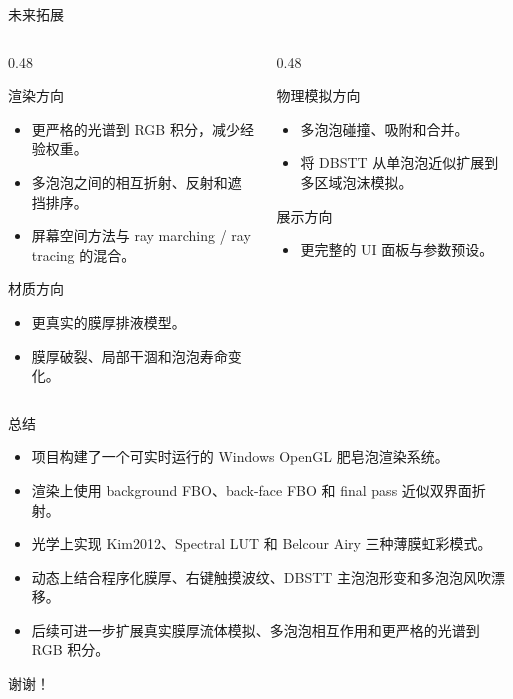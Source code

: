 \documentclass[11pt,aspectratio=169]{beamer}
\begin{document}
\begin{frame}{未来拓展}
  \begin{columns}[T]
    \begin{column}{0.48\linewidth}
      \begin{block}{渲染方向}
        \begin{itemize}
          \item 更严格的光谱到 RGB 积分，减少经验权重。
          \item 多泡泡之间的相互折射、反射和遮挡排序。
          \item 屏幕空间方法与 ray marching / ray tracing 的混合。
        \end{itemize}
      \end{block}
      \begin{block}{材质方向}
        \begin{itemize}
          \item 更真实的膜厚排液模型。
          \item 膜厚破裂、局部干涸和泡泡寿命变化。
        \end{itemize}
      \end{block}
    \end{column}
    \begin{column}{0.48\linewidth}
      \begin{block}{物理模拟方向}
        \begin{itemize}
          \item 多泡泡碰撞、吸附和合并。
          \item 将 DBSTT 从单泡泡近似扩展到多区域泡沫模拟。
        \end{itemize}
      \end{block}
      \begin{block}{展示方向}
        \begin{itemize}
          \item 更完整的 UI 面板与参数预设。
        \end{itemize}
      \end{block}
    \end{column}
  \end{columns}
\end{frame}

\begin{frame}{总结}
  \begin{itemize}
    \item 项目构建了一个可实时运行的 Windows OpenGL 肥皂泡渲染系统。
    \item 渲染上使用 background FBO、back-face FBO 和 final pass 近似双界面折射。
    \item 光学上实现 Kim2012、Spectral LUT 和 Belcour Airy 三种薄膜虹彩模式。
    \item 动态上结合程序化膜厚、右键触摸波纹、DBSTT 主泡泡形变和多泡泡风吹漂移。
    \item 后续可进一步扩展真实膜厚流体模拟、多泡泡相互作用和更严格的光谱到 RGB 积分。
  \end{itemize}
  \vspace{0.8em}
  \centering
  \Large 谢谢！
\end{frame}
\end{document}
